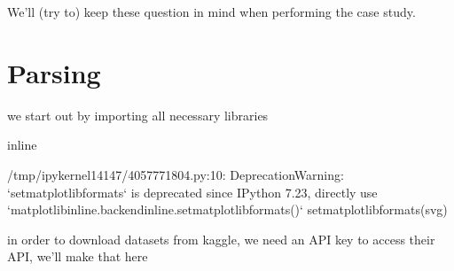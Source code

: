 \documentclass[letterpaper,10pt,english]{jupyterBook}
\begin{document}
\sphinxAtStartPar
We’ll (try to) keep these question in mind when performing the case study.


\section{Parsing}
\label{\detokenize{c7_case_studies/Olist:parsing}}
\sphinxAtStartPar
we start out by importing all necessary libraries

\begin{sphinxVerbatim}[commandchars=\\\{\}]
 
 
   
   
   
 
   
   
 inline
\end{sphinxVerbatim}

\begin{sphinxVerbatim}[commandchars=\\\{\}]
/tmp/ipykernel\PYGZus{}14147/4057771804.py:10: DeprecationWarning: `set\PYGZus{}matplotlib\PYGZus{}formats` is deprecated since IPython 7.23, directly use `matplotlib\PYGZus{}inline.backend\PYGZus{}inline.set\PYGZus{}matplotlib\PYGZus{}formats()`
  set\PYGZus{}matplotlib\PYGZus{}formats(\PYGZsq{}svg\PYGZsq{})
\end{sphinxVerbatim}

\sphinxAtStartPar
in order to download datasets from kaggle, we need an API key to access their API, we’ll make that here
\end{document}
